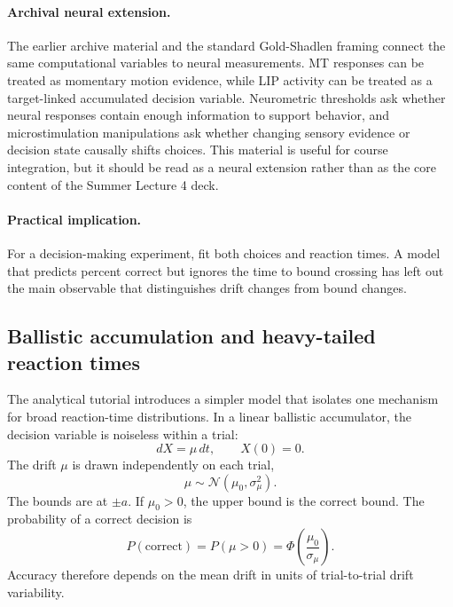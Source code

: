 \paragraph{Archival neural extension.}
The earlier archive material and the standard Gold-Shadlen framing connect the same computational variables to neural measurements. MT responses can be treated as momentary motion evidence, while LIP activity can be treated as a target-linked accumulated decision variable. Neurometric thresholds ask whether neural responses contain enough information to support behavior, and microstimulation manipulations ask whether changing sensory evidence or decision state causally shifts choices. This material is useful for course integration, but it should be read as a neural extension rather than as the core content of the Summer Lecture 4 deck.

\paragraph{Practical implication.}
For a decision-making experiment, fit both choices and reaction times. A model that predicts percent correct but ignores the time to bound crossing has left out the main observable that distinguishes drift changes from bound changes.

\subsection{Ballistic accumulation and heavy-tailed reaction times}

The analytical tutorial introduces a simpler model that isolates one mechanism for broad reaction-time distributions. In a linear ballistic accumulator, the decision variable is noiseless within a trial:
\[
  dX=\mu\,dt,
  \qquad
  X(0)=0.
\]
The drift \(\mu\) is drawn independently on each trial,
\[
  \mu\sim \mathcal N(\mu_0,\sigma_\mu^2).
\]
The bounds are at \(\pm a\). If \(\mu_0>0\), the upper bound is the correct bound. The probability of a correct decision is
\[
  P(\mathrm{correct})
  =
  P(\mu>0)
  =
  \Phi\!\left(\frac{\mu_0}{\sigma_\mu}\right).
\]
Accuracy therefore depends on the mean drift in units of trial-to-trial drift variability.

